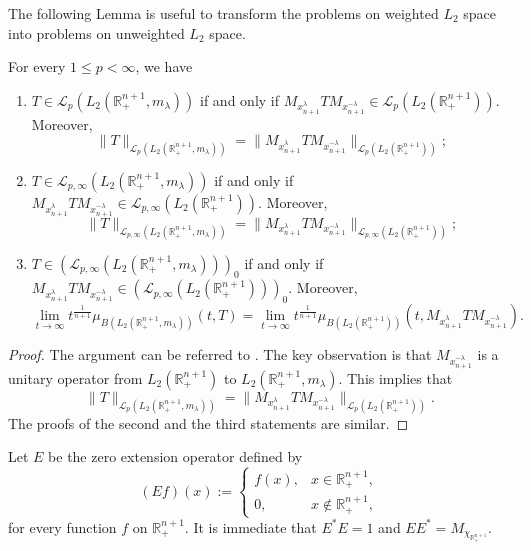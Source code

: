 \documentclass[12pt]{amsart}
\begin{document}
The following Lemma is useful to transform the problems on weighted $L_2$ space into problems on unweighted $L_2$ space.
\begin{lemma}\label{weight}
For every $1\leq p<\infty$, we have{\color{blue}
\begin{enumerate}[{\rm (i)}]
\item $T\in\mathcal{L}_{p}(L_2(\mathbb{R}_+^{n+1},m_\lambda))$ if and only if $M_{x_{n+1}^\lambda}TM_{x_{n+1}^{-\lambda}}\in\mathcal{L}_{p}(L_2(\mathbb{R}_+^{n+1}))$. Moreover,
$$\|T\|_{\mathcal{L}_{p}(L_2(\mathbb{R}_+^{n+1},m_\lambda))}=\|M_{x_{n+1}^\lambda}TM_{x_{n+1}^{-\lambda}}\|_ {\mathcal{L}_{p}(L_2(\mathbb{R}_+^{n+1}))};$$
\item $T\in\mathcal{L}_{p,\infty}(L_2(\mathbb{R}_+^{n+1},m_\lambda))$ if and only if $M_{x_{n+1}^\lambda}TM_{x_{n+1}^{-\lambda}}\in\mathcal{L}_{p,\infty}(L_2(\mathbb{R}_+^{n+1}))$. Moreover,
$$\|T\|_{\mathcal{L}_{p,\infty}(L_2(\mathbb{R}_+^{n+1},m_\lambda))}=\|M_{x_{n+1}^\lambda}TM_{x_{n+1}^{-\lambda}}\|_ {\mathcal{L}_{p,\infty}(L_2(\mathbb{R}_+^{n+1}))};$$
\item $T\in(\mathcal{L}_{p,\infty}(L_2(\mathbb{R}_+^{n+1},m_\lambda)))_0$ if and only if $M_{x_{n+1}^\lambda}TM_{x_{n+1}^{-\lambda}}\in(\mathcal{L}_{p,\infty}(L_2(\mathbb{R}_+^{n+1})))_0$. Moreover,
$$\lim_{t\to\infty}t^{\frac1{n+1}}\mu_{B(L_2(\mathbb{R}^{n+1}_+,m_{\lambda}))}(t,T)=\lim_{t\to\infty}t^{\frac1{n+1}}\mu_{B(L_2(\mathbb{R}^{n+1}_+))}(t,M_{x_{n+1}^\lambda}TM_{x_{n+1}^{-\lambda}}).$$
\end{enumerate}}
\end{lemma}
\begin{proof}
The argument can be referred to \cite[Lemma 2.7]{MR4706933}. The key observation is that $M_{x_{n+1}^{-\lambda}}$ is a unitary operator from $L_2(\mathbb{R}_+^{n+1})$ to $L_2(\mathbb{R}_+^{n+1},m_\lambda)$. This implies that{\color{blue}
$$\|T\|_{\mathcal{L}_{p}(L_2(\mathbb{R}_+^{n+1},m_\lambda))}=\|M_{x_{n+1}^\lambda}TM_{x_{n+1}^{-\lambda}}\|_ {\mathcal{L}_{p}(L_2(\mathbb{R}_+^{n+1}))}.$$}
The proofs of the second and the third statements are similar.
\end{proof}

Let $E$ be the zero extension operator defined by
$$(Ef)(x):=\begin{cases}
f(x),& x\in \mathbb{R}_+^{n+1},\\
0,& x\notin \mathbb{R}_+^{n+1},
\end{cases}
$$
for every function $f$ on $\mathbb{R}_+^{n+1}.$ It is immediate that $E^{\ast}E=1$ and $EE^{\ast}=M_{\chi_{\mathbb{R}_+^{n+1}}}.$
\end{document}
